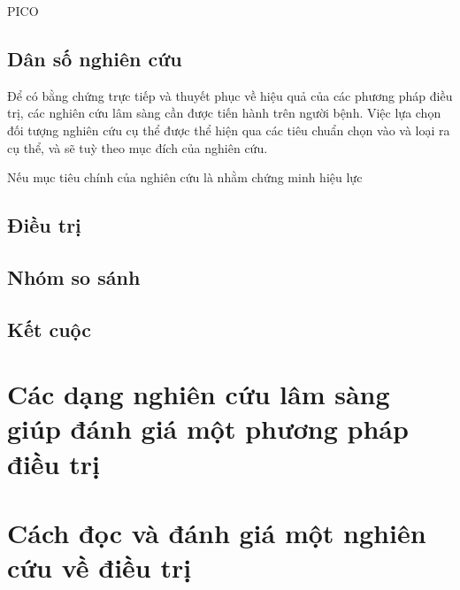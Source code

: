\documentclass[
]{book}
\begin{document}
PICO

\hypertarget{duxe2n-sux1ed1-nghiuxean-cux1ee9u}{%
\subsection{Dân số nghiên cứu}\label{duxe2n-sux1ed1-nghiuxean-cux1ee9u}}

Để có bằng chứng trực tiếp và thuyết phục về hiệu quả của các phương pháp điều trị, các nghiên cứu lâm sàng cần được tiến hành trên người bệnh. Việc lựa chọn đối tượng nghiên cứu cụ thể được thể hiện qua các tiêu chuẩn chọn vào và loại ra cụ thể, và sẽ tuỳ theo mục đích của nghiên cứu.

Nếu mục tiêu chính của nghiên cứu là nhằm chứng minh hiệu lực

\hypertarget{ux111iux1ec1u-trux1ecb}{%
\subsection{Điều trị}\label{ux111iux1ec1u-trux1ecb}}

\hypertarget{nhuxf3m-so-suxe1nh}{%
\subsection{Nhóm so sánh}\label{nhuxf3m-so-suxe1nh}}

\hypertarget{kux1ebft-cuux1ed9c}{%
\subsection{Kết cuộc}\label{kux1ebft-cuux1ed9c}}

\hypertarget{cuxe1c-dux1ea1ng-nghiuxean-cux1ee9u-luxe2m-suxe0ng-giuxfap-ux111uxe1nh-giuxe1-mux1ed9t-phux1b0ux1a1ng-phuxe1p-ux111iux1ec1u-trux1ecb}{%
\section{Các dạng nghiên cứu lâm sàng giúp đánh giá một phương pháp điều trị}\label{cuxe1c-dux1ea1ng-nghiuxean-cux1ee9u-luxe2m-suxe0ng-giuxfap-ux111uxe1nh-giuxe1-mux1ed9t-phux1b0ux1a1ng-phuxe1p-ux111iux1ec1u-trux1ecb}}

\hypertarget{cuxe1ch-ux111ux1ecdc-vuxe0-ux111uxe1nh-giuxe1-mux1ed9t-nghiuxean-cux1ee9u-vux1ec1-ux111iux1ec1u-trux1ecb}{%
\section{Cách đọc và đánh giá một nghiên cứu về điều trị}\label{cuxe1ch-ux111ux1ecdc-vuxe0-ux111uxe1nh-giuxe1-mux1ed9t-nghiuxean-cux1ee9u-vux1ec1-ux111iux1ec1u-trux1ecb}}
\end{document}
